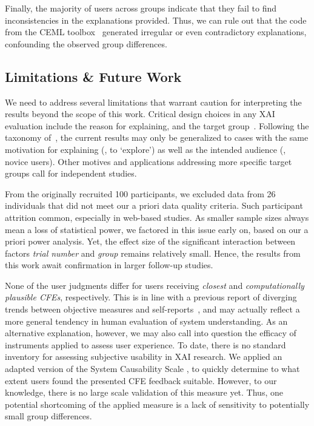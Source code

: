 Finally, the majority of users across groups indicate that they fail to find inconsistencies in the explanations provided.
Thus, we can rule out that the code from the CEML toolbox~\cite{artelt_ceml_2019} generated irregular or even contradictory explanations, confounding the observed group differences.

\subsection{Limitations \& Future Work}\label{subsec:limitations-future-work}

We need to address several limitations that warrant caution for interpreting the results beyond the scope of this work.
Critical design choices in any \gls{XAI} evaluation include the reason for explaining, and the target group~\cite{adadi_peeking_2018}.
Following the taxonomy of~\citeauthor{adadi_peeking_2018}, the current results may only be generalized to cases with the same motivation for explaining (\ie, to `explore') as well as the intended audience (\ie, novice users).
Other motives and applications addressing more specific target groups call for independent studies.

From the originally recruited 100 participants, we excluded data from 26 individuals that did not meet our a priori data quality criteria.
Such participant attrition common, especially in web-based studies. 
As smaller sample sizes always mean a loss of statistical power, we factored in this issue early on, based on our a priori power analysis. 
Yet, the effect size of the significant interaction between factors \textit{trial number} and \textit{group} remains relatively small. 
Hence, the results from this work await confirmation in larger follow-up studies.
 
None of the user judgments differ for users receiving \textit{closest} and \textit{computationally plausible \glspl{CFE}}, respectively.
This is in line with a previous report of diverging trends between objective measures and self-reports~\citep{van_der_waa_evaluating_2021}, and may actually reflect a more general tendency in human evaluation of system understanding.
As an alternative explanation, however, we may also call into question the efficacy of instruments applied to assess user experience. 
To date, there is no standard inventory for assessing subjective usability in \gls{XAI} research.
We applied an adapted version of the System Causability Scale \cite{holzinger_measuring_2020}, to quickly determine to what extent users found the presented \gls{CFE} feedback suitable.
However, to our knowledge, there is no large scale validation of this measure yet.
Thus, one potential shortcoming of the applied measure is a lack of sensitivity to potentially small group differences.

